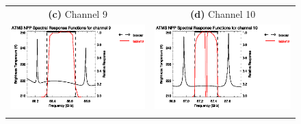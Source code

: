 \begin{figure}[H]
\begin{tabular}{c c}
    \textsf{\textbf{(c)} Channel 9} &
    \textsf{\textbf{(d)} Channel 10} \\
    \includegraphics[bb=70 400 300 559,clip,scale=1.0]{graphics/srf/table12/atms_npp.ch9.osrf.eps} &
    \includegraphics[bb=70 400 300 559,clip,scale=1.0]{graphics/srf/table12/atms_npp.ch10.osrf.eps} \\\\


\end{tabular}
\end{figure}
